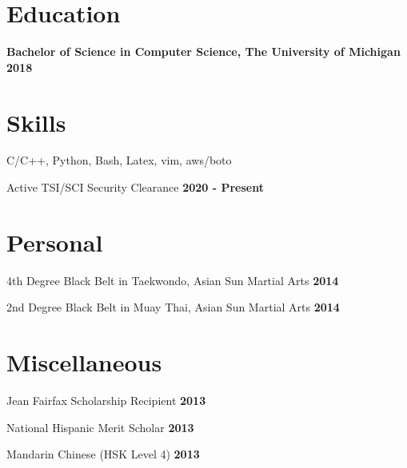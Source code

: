 \documentclass[margin,line]{resume}
\begin{document}
\begin{resume}
    \section{\mysidestyle Education}
    \hfill

    \textbf{Bachelor of Science in Computer Science, The University of Michigan}
    \hfill \textbf{\hfill 2018}

    \section{\mysidestyle Skills}
    \hfill

    \begin{list2}
    \item C/C++, Python, Bash, Latex, vim, aws/boto
    \item Active TSI/SCI Security Clearance \hfill \textbf{2020 - Present}
    \end{list2}

    \section{\mysidestyle Personal}
    \hfill

    \begin{list2}
    \item 4th Degree Black Belt in Taekwondo, Asian Sun Martial Arts \hfill \textbf{2014}
    \item 2nd Degree Black Belt in Muay Thai, Asian Sun Martial Arts \hfill \textbf{2014}
    \end{list2}

    \section{\mysidestyle Miscellaneous}
    \hfill

    \begin{list2}
    \item Jean Fairfax Scholarship Recipient \hfill \textbf{2013}
    \item National Hispanic Merit Scholar \hfill \textbf{2013}
    \item Mandarin Chinese (HSK Level 4) \hfill \textbf{2013}
    \end{list2}


\end{resume}
\end{document}
